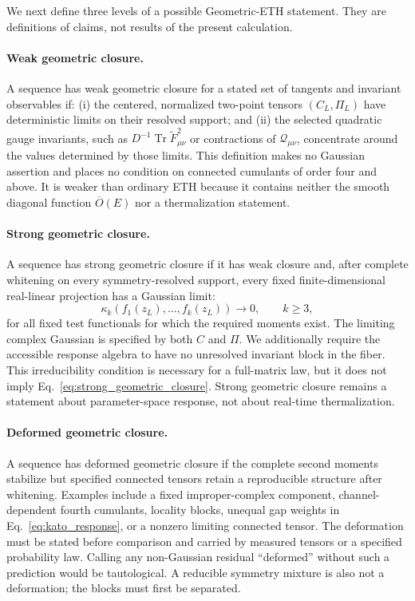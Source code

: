 We next define three levels of a possible Geometric-ETH statement.  They are
definitions of claims, not results of the present calculation.

\paragraph{Weak geometric closure.}
A sequence has weak geometric closure for a stated set of tangents and
invariant observables if: (i) the centered, normalized two-point tensors
$(C_L,\Pi_L)$ have deterministic limits on their resolved support; and (ii)
the selected quadratic gauge invariants, such as
$D^{-1}\operatorname{Tr}\widetilde F_{\mu\nu}^2$ or contractions of
$\mathcal Q_{\mu\nu}$, concentrate around the values determined by those
limits.  This definition makes no Gaussian assertion and places no condition
on connected cumulants of order four and above.  It is weaker than ordinary
ETH because it contains neither the smooth diagonal function
$\overline O(E)$ nor a thermalization statement.

\paragraph{Strong geometric closure.}
A sequence has strong geometric closure if it has weak closure and, after
complete whitening on every symmetry-resolved support, every fixed
finite-dimensional real-linear projection has a Gaussian limit:
\begin{equation}
 \kappa_k\!\left(
 f_1(z_L),\ldots,f_k(z_L)
 \right)\longrightarrow0,
 \qquad k\ge3,
 \label{eq:strong_geometric_closure}
\end{equation}
for all fixed test functionals for which the required moments exist.  The
limiting complex Gaussian is specified by both $C$ and $\Pi$.  We additionally
require the accessible response algebra to have no unresolved invariant
block in the fiber.  This irreducibility condition is necessary for a
full-matrix law, but it does not imply
Eq.~\eqref{eq:strong_geometric_closure}.  Strong geometric closure remains a
statement about parameter-space response, not about real-time thermalization.

\paragraph{Deformed geometric closure.}
A sequence has deformed geometric closure if the complete second moments
stabilize but specified connected tensors retain a reproducible structure
after whitening.  Examples include a fixed improper-complex component,
channel-dependent fourth cumulants, locality blocks, unequal gap weights in
Eq.~\eqref{eq:kato_response}, or a nonzero limiting connected tensor.  The
deformation must be stated before comparison and carried by measured tensors
or a specified probability law.  Calling any non-Gaussian residual
``deformed'' without such a prediction would be tautological.  A reducible
symmetry mixture is also not a deformation; the blocks must first be
separated.

